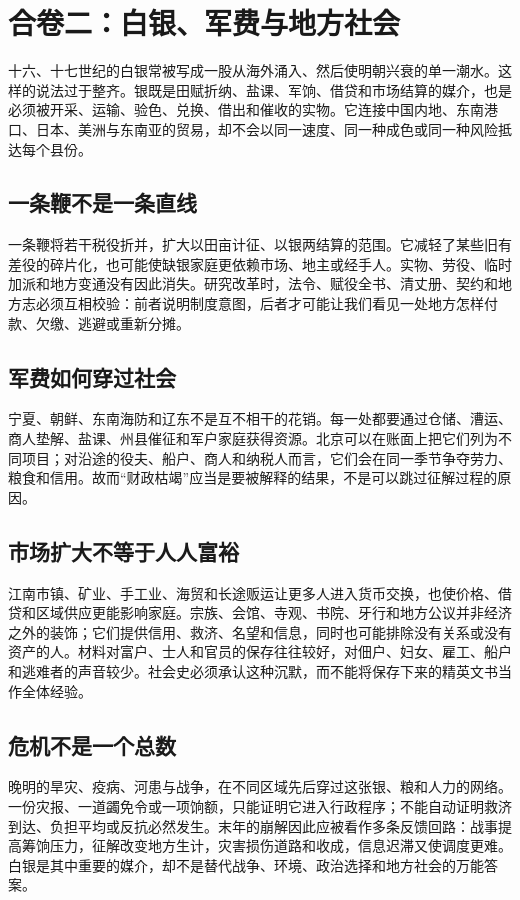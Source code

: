 \chapter{合卷二：白银、军费与地方社会}
\label{ch:ming-synthesis-silver}

十六、十七世纪的白银常被写成一股从海外涌入、然后使明朝兴衰的单一潮水。这样的说法过于整齐。银既是田赋折纳、盐课、军饷、借贷和市场结算的媒介，也是必须被开采、运输、验色、兑换、借出和催收的实物。它连接中国内地、东南港口、日本、美洲与东南亚的贸易，却不会以同一速度、同一种成色或同一种风险抵达每个县份。

\section{一条鞭不是一条直线}

一条鞭将若干税役折并，扩大以田亩计征、以银两结算的范围。它减轻了某些旧有差役的碎片化，也可能使缺银家庭更依赖市场、地主或经手人。实物、劳役、临时加派和地方变通没有因此消失。研究改革时，法令、赋役全书、清丈册、契约和地方志必须互相校验：前者说明制度意图，后者才可能让我们看见一处地方怎样付款、欠缴、逃避或重新分摊。

\section{军费如何穿过社会}

宁夏、朝鲜、东南海防和辽东不是互不相干的花销。每一处都要通过仓储、漕运、商人垫解、盐课、州县催征和军户家庭获得资源。北京可以在账面上把它们列为不同项目；对沿途的役夫、船户、商人和纳税人而言，它们会在同一季节争夺劳力、粮食和信用。故而“财政枯竭”应当是要被解释的结果，不是可以跳过征解过程的原因。

\section{市场扩大不等于人人富裕}

江南市镇、矿业、手工业、海贸和长途贩运让更多人进入货币交换，也使价格、借贷和区域供应更能影响家庭。宗族、会馆、寺观、书院、牙行和地方公议并非经济之外的装饰；它们提供信用、救济、名望和信息，同时也可能排除没有关系或没有资产的人。材料对富户、士人和官员的保存往往较好，对佃户、妇女、雇工、船户和逃难者的声音较少。社会史必须承认这种沉默，而不能将保存下来的精英文书当作全体经验。

\section{危机不是一个总数}

晚明的旱灾、疫病、河患与战争，在不同区域先后穿过这张银、粮和人力的网络。一份灾报、一道蠲免令或一项饷额，只能证明它进入行政程序；不能自动证明救济到达、负担平均或反抗必然发生。末年的崩解因此应被看作多条反馈回路：战事提高筹饷压力，征解改变地方生计，灾害损伤道路和收成，信息迟滞又使调度更难。白银是其中重要的媒介，却不是替代战争、环境、政治选择和地方社会的万能答案。
